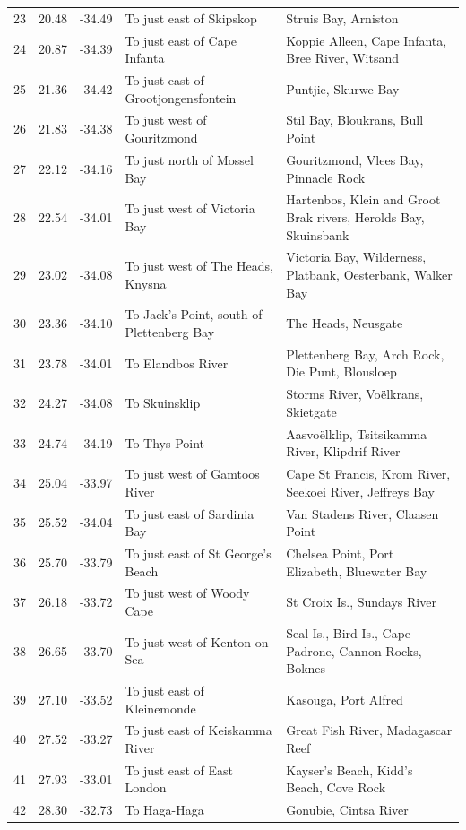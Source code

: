 \documentclass[10pt,a4,]{article}
\begin{document}
\begin{tiny}
\begin{center}
\begin{longtable}{|r|r|r|l|p{6cm}|}
23 & 20.48 & -34.49 & To just east of Skipskop & Struis Bay, Arniston \\
24 & 20.87 & -34.39 & To just east of Cape Infanta & Koppie Alleen, Cape Infanta, Bree River, Witsand \\
25 & 21.36 & -34.42 & To just east of Grootjongensfontein & Puntjie, Skurwe Bay \\
26 & 21.83 & -34.38 & To just west of Gouritzmond & Stil Bay, Bloukrans, Bull Point \\
27 & 22.12 & -34.16 & To just north of Mossel Bay & Gouritzmond, Vlees Bay, Pinnacle Rock \\
28 & 22.54 & -34.01 & To just west of Victoria Bay & Hartenbos, Klein and Groot Brak rivers, Herolds Bay, Skuinsbank \\
29 & 23.02 & -34.08 & To just west of The Heads, Knysna & Victoria Bay, Wilderness, Platbank, Oesterbank, Walker Bay \\
30 & 23.36 & -34.10 & To Jack’s Point, south of Plettenberg Bay  & The Heads, Neusgate \\
31 & 23.78 & -34.01 & To Elandbos River & Plettenberg Bay, Arch Rock, Die Punt, Blousloep \\
32 & 24.27 & -34.08 & To Skuinsklip & Storms River, Voëlkrans, Skietgate \\
33 & 24.74 & -34.19 & To Thys Point & Aasvoëlklip, Tsitsikamma River, Klipdrif River \\
34 & 25.04 & -33.97 & To just west of Gamtoos River & Cape St Francis, Krom River, Seekoei River, Jeffreys Bay \\
35 & 25.52 & -34.04 & To just east of Sardinia Bay & Van Stadens River, Claasen Point \\
36 & 25.70 & -33.79 & To just east of St George’s Beach & Chelsea Point, Port Elizabeth, Bluewater Bay \\
37 & 26.18 & -33.72 & To just west of Woody Cape & St Croix Is., Sundays River \\
38 & 26.65 & -33.70 & To just west of Kenton-on-Sea & Seal Is., Bird Is., Cape Padrone, Cannon Rocks, Boknes \\
39 & 27.10 & -33.52 & To just east of Kleinemonde & Kasouga, Port Alfred \\
40 & 27.52 & -33.27 & To just east of Keiskamma River & Great Fish River, Madagascar Reef \\
41 & 27.93 & -33.01 & To just east of East London & Kayser’s Beach, Kidd’s Beach, Cove Rock \\
42 & 28.30 & -32.73 & To Haga-Haga & Gonubie, Cintsa River \\

\end{longtable}
\end{center}
\end{tiny}
\end{document}
